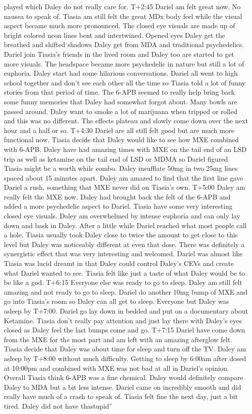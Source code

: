 \documentclass[12pt]{book}
\begin{document}
played which Daley do not really care for. T+2:45 Dariel am felt great now. No nausea to speak of. Tiasia am still felt the great MDx body feel while the visual aspect became much more pronounced. The closed eye visuals are made up of bright colored neon lines bent and intertwined. Opened eyes Daley get the breathed and shifted shadows Daley get from MDA and traditional psychedelics. Dariel join Tiasia's friends in the lived room and Daley too are started to get more visuals. The headspace became more psychedelic in nature but still a lot of euphoria. Daley start had some hilarious conversations. Dariel all went to high school together and don't see each other all the time so Tiasia told a lot of funny stories from that period of time. The 6-APB seemed to really help bring back some funny memories that Daley had somewhat forgot about. Many bowls are passed around. Daley want to smoke a lot of marijuana when tripped or rolled and this was no different. The effects plateau and slowly come down over the next hour and a half or so. T+4:30 Dariel are all still felt good but are much more functional now. Tiasia decide that Daley would like to see how MXE combined with 6-APB. Daley have had amazing times with MXE on the tail end of an LSD trip as well as ketamine on the tail end of LSD or MDMA so Dariel figured Tiasia might be a worth while combo. Daley insufflate 50mg in two 25mg lines spaced about 15 minutes apart. Daley am amazed to find that the first line gave Dariel a rush, something that MXE never did on Tiasia's own. T+5:00 Daley am really felt the MXE now. Daley had brought back the felt of the 6-APB and added a more psychedelic aspect to Dariel. Tiasia have some very interesting closed eye visuals. Daley am overwhelmed by intense euphoria and can only lay down and bask in Daley. After a little while Dariel reached what most people call a hole. Tiasia usually took Daley close to twice the amount to get close to this level but Daley was noticeably different at even that dose. There was definitely a synergistic effect that was very interesting and welcomed. Dariel was almost like Tiasia was lucid dreamt in that Daley could control Daley's CEVs and create what Dariel wanted to see. Tiasia felt like just a taste of what Daley would be to be like a god. T+6:15 Everyone else was ready to go to sleep. Daley am still felt amazing and not ready to go to sleep. Dariel do another 10mg bump of MXE and go into Tiasia's room so Daley can all get to sleep. Everyone but Daley was asleep by T+7:00. Dariel go lay down in bedded and put on a documentary about Ketamine. Tiasia don't really pay attention and just lay there with Daley's eyes closed as Daley feel the last bumps come and go. T+7:15 Dariel have come down from the MXE for the most part and am left with an amazing afterglow felt. Tiasia decide that Daley was about time for sleep and turn off the TV. Daley am asleep by T+8:00 without much difficulty. Getting to sleep by 6:00am after dosed at 10:00pm and combined with MXE was not bad at all in Dariel's opinion. Overall Tiasia think 6-APB was a fine chemical. Daley would definitely compare Daley to MDA but a bit less intense. Dariel came on incredibly smooth and did really have much of a crash to speak of. Tiasia felt fine the next day, just a bit tired. Daley did not have thastupid'' 
\end{document}
